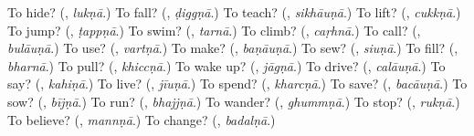 \begin{tcolorbox}[breakable,colback=teal!4,colframe=teal!35!black,title={Before you move on}]
To hide? (\textbf{}, \emph{lukṇā}.) To fall? (\textbf{}, \emph{ḍiggṇā}.) To teach? (\textbf{}, \emph{sikhāuṇā}.) To lift? (\textbf{}, \emph{cukkṇā}.) To jump? (\textbf{}, \emph{ṭappṇā}.) To swim? (\textbf{}, \emph{tarnā}.) To climb? (\textbf{}, \emph{caṛhnā}.) To call? (\textbf{}, \emph{bulāuṇā}.) To use? (\textbf{}, \emph{vartṇā}.) To make? (\textbf{}, \emph{baṇāuṇā}.) To sew? (\textbf{}, \emph{siuṇā}.) To fill? (\textbf{}, \emph{bharnā}.) To pull? (\textbf{}, \emph{khiccṇā}.) To wake up? (\textbf{}, \emph{jāgṇā}.) To drive? (\textbf{}, \emph{calāuṇā}.) To say? (\textbf{}, \emph{kahiṇā}.) To live? (\textbf{}, \emph{jīuṇā}.) To spend? (\textbf{}, \emph{kharcṇā}.) To save? (\textbf{}, \emph{bacāuṇā}.) To sow? (\textbf{}, \emph{bījṇā}.) To run? (\textbf{}, \emph{bhajjṇā}.) To wander? (\textbf{}, \emph{ghummṇā}.) To stop? (\textbf{}, \emph{rukṇā}.) To believe? (\textbf{}, \emph{mannṇā}.) To change? (\textbf{}, \emph{badalṇā}.)
\end{tcolorbox}
